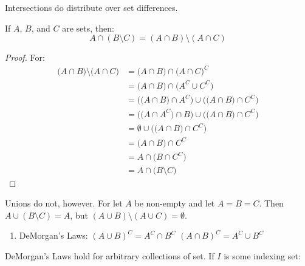 \documentclass[crop=false,class=book,oneside]{standalone}
\begin{document}
            Intersections do distribute over set differences.
            \begin{theorem}
                If $A$, $B$, and $C$ are sets, then:
                \begin{equation}
                    A\cap(B\setminus{C})=
                    (A\cap{B})\setminus(A\cap{C})
                \end{equation}
            \end{theorem}
            \begin{proof}
                For:
                \begin{subequations}
                    \begin{align}
                        \big(A\cap{B}\big)\setminus\big(A\cap{C}\big)
                        &=\big(A\cap{B}\big)\cap\big(A\cap{C}\big)^{C}\\
                        &=\big(A\cap{B}\big)\cap\big(A^{C}\cup{C}^{C}\big)\\
                        &=\Big(\big(A\cap{B}\big)\cap{A}^{C}\Big)
                            \cup\Big(\big({A}\cap{B}\big)\cap{C}^{C}\Big)\\
                        &=\Big(\big(A\cap{A}^{C}\big)\cap{B}\Big)\cup
                            \Big(\big(A\cap{B}\big)\cap{C}^{C}\Big)\\
                        &=\emptyset\cup
                            \Big(\big(A\cap{B}\big)\cap{C}^{C}\Big)\\
                        &=\big(A\cap{B}\big)\cap{C}^{C}\\
                        &=A\cap\big(B\cap{C}^{C}\big)\\
                        &=A\cap\big(B\setminus{C}\big)
                    \end{align}
                \end{subequations}
            \end{proof}
            Unions do not, however. For let $A$ be non-empty and let
            $A=B=C$. Then $A\cup(B\setminus{C})=A$, but
            $(A\cup{B})\setminus(A\cup{C})=\emptyset$.
            \begin{enumerate}
                \item DeMorgan's Laws:
                      \subitem $(A\cup{B})^{C}=A^{C}\cap{B}^{C}$
                      \subitem $(A\cap{B})^{C}=A^{C}\cup{B}^{C}$
            \end{enumerate}
            DeMorgan's Laws hold for arbitrary collections
            of set. If $I$ is some indexing set:
\end{document}
